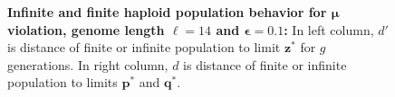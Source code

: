 \begin{figure}[h]
\begin{center}
\hspace{-3em}%
\vspace{-0.5em} \hspace{-3em}%


\caption[\textbf{Infinite and finite haploid population behavior for $\bm{\mu}$ violation, genome length $\ell = 14$ and $\bm{\epsilon} = 0.1$}]{\textbf{Infinite and finite haploid population behavior for $\bm{\mu}$ violation, genome length $\ell = 14$ and $\bm{\epsilon} = 0.1$:} 
  In left column, $d'$ is distance of finite or infinite population to limit $\bm{z}^\ast$ for $g$ generations. In right column, $d$ is distance of finite or infinite population to limits $\bm{p}^\ast$ and $\bm{q}^\ast$.}
\label{oscillation_14h_vio_mu_0.1}
\end{center}
\end{figure}

